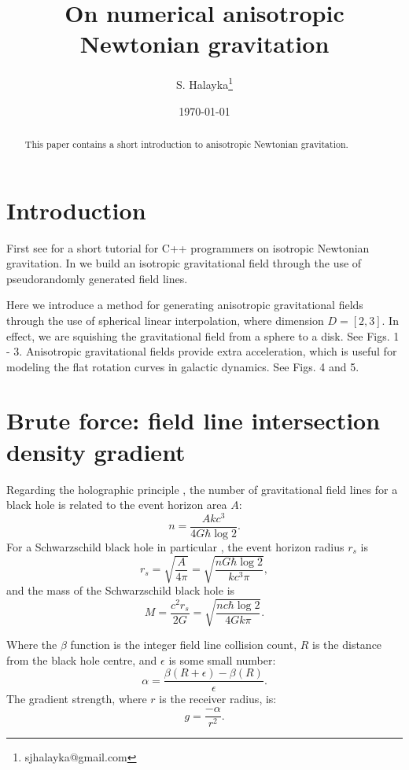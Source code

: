 \documentclass[12pt]{article}
\title{On numerical anisotropic Newtonian gravitation}
\author{S. Halayka\footnote{sjhalayka@gmail.com}}
\date{\today\;\currenttime}
\begin{document}
 
\maketitle

\begin{abstract}
This paper contains a short introduction to anisotropic Newtonian gravitation.
\end{abstract}



\section{Introduction}

First see \cite{halayka} for a short tutorial for C++ programmers on isotropic Newtonian gravitation.
In \cite{halayka} we build an isotropic gravitational field through the use of pseudorandomly generated field lines.

Here we introduce a method for generating anisotropic gravitational fields through the use of spherical linear interpolation, where dimension $D = [2, 3]$.
In effect, we are squishing the gravitational field from a sphere to a disk.
See Figs. 1 - 3.
Anisotropic gravitational fields provide extra acceleration, which is useful for modeling the flat rotation curves in galactic dynamics.
See Figs. 4 and 5.




\section{Brute force: field line intersection density gradient}

Regarding the holographic principle \cite{hooft, susskind}, the number of gravitational field lines for a black hole is related to the event horizon area $A$:
\begin{equation}
n = \frac{A k c^3}{ 4 G \hbar \log 2}.
\end{equation}
For a Schwarzschild black hole in particular \cite{misner}, the event horizon radius $r_s$ is
\begin{equation}
r_s = \sqrt{\frac{A}{4 \pi}} = \sqrt{\frac{n G \hbar \log 2}{k c^3 \pi}},
\end{equation}
and the mass of the Schwarzschild black hole is
\begin{equation}
M = \frac{c^2 r_s}{2 G} = \sqrt{\frac{n c \hbar \log 2}{4 G k \pi}}.
\end{equation}

Where the $\beta$ function is the integer field line collision count, $R$ is the distance from the black hole centre, and $\epsilon$ is some small number:
\begin{equation}
\alpha = \frac{\beta(R + \epsilon) - \beta(R)}{\epsilon}.
\end{equation}
The gradient strength, where $r$ is the receiver radius, is:
\begin{equation}
g = \frac{-\alpha}{r^2}. 
\end{equation}
\end{document}
